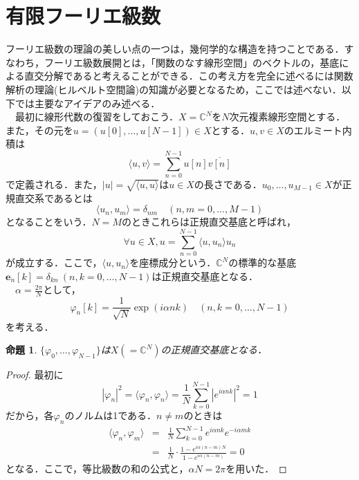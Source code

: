 \documentclass[a4j]{jsbook}
\newtheorem{prop}[theorem]{命題}
\numberwithin{theorem}{chapter}  %
\begin{document}
\section{有限フーリエ級数} \label{sec1-6}
フーリエ級数の理論の美しい点の一つは，幾何学的な構造を持つことである．すなわち，フーリエ級数展開とは，「関数のなす線形空間」のベクトルの，基底による直交分解であると考えることができる．この考え方を完全に述べるには関数解析の理論(ヒルベルト空間論)の知識が必要となるため，ここでは述べない．以下では主要なアイデアのみ述べる．\\
　最初に線形代数の復習をしておこう．\(X=\mathbb{C}^N\)を\(N\)次元複素線形空間とする．また，その元を\(u=(u[0], \dots, u[N-1])\in X\)とする．\(u, v\in X\)のエルミート内積は
\begin{equation*}
    \langle u, v\rangle=\sum_{n=0}^{N-1} u[n]\overline{v[n]}
\end{equation*}
で定義される．また，\(|u|=\sqrt{\langle u, u\rangle}\)は\(u\in X\)の長さである．\(u_0, \dots, u_{M-1}\in X\)が正規直交系であるとは
\begin{equation*}
    \langle u_n, u_m\rangle=\delta_{nm}\quad (n, m=0, \dots, M-1)
\end{equation*}
となることをいう．\(N=M\)のときこれらは正規直交基底と呼ばれ，
\begin{equation*}
    \forall u\in X, u=\sum_{n=0}^{N-1}\langle u, u_n\rangle u_n
\end{equation*}
が成立する．ここで，\(\langle u, u_n\rangle\)を座標成分という．\(\mathbb{C}^N\)の標準的な基底\(\bm{e}_n[k]=\delta_{kn}\ (n, k=0, \dots, N-1)\)は正規直交基底となる．\\
　\(\displaystyle\alpha=\frac{2\pi}{N}\)として，
\begin{equation*}
    \varphi_n[k]=\frac{1}{\sqrt{N}}\exp(i\alpha nk)\quad (n, k=0, \dots, N-1)
\end{equation*}
を考える．
\begin{prop}
\label{prop1-4}
\(\{\varphi_0, \dots, \varphi_{N-1}\}\)は\(X(=\mathbb{C}^N)\)の正規直交基底となる．
\end{prop}
\begin{proof}
最初に
\begin{equation*}
    |\varphi_n|^2=\langle\varphi_n, \varphi_n\rangle=\frac{1}{N}\sum_{k=0}^{N-1}\left|e^{i\alpha nk}\right|^2=1
\end{equation*}
だから，各\(\varphi_n\)のノルムは1である．\(n\neq m\)のときは
\begin{eqnarray*}
\langle\varphi_n, \varphi_m\rangle&=&\frac{1}{N}\sum_{k=0}^{N-1}e^{i\alpha nk}e^{-i\alpha mk} \\
&=&\frac{1}{N}\cdot\frac{1-e^{i\alpha(n-m)N}}{1-e^{i\alpha(n-m)}}=0
\end{eqnarray*}
となる．ここで，等比級数の和の公式と，\(\alpha N=2\pi\)を用いた．
\end{proof}
\end{document}
